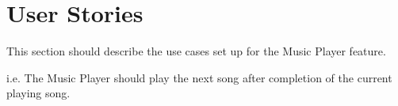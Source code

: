 \section{User Stories}



This section should describe the use cases set up for the Music Player feature.

i.e. The Music Player should play the next song after completion of the current playing song.